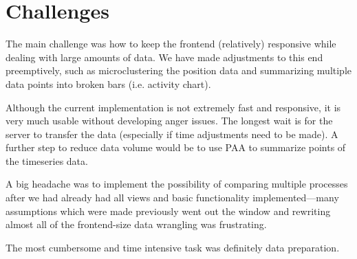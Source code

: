 \documentclass[naustrian]{scrartcl}
\begin{document}
\section{Challenges}

The main challenge was how to keep the frontend (relatively) responsive while
dealing with large amounts of data. We have made adjustments to this end
preemptively, such as microclustering the position data and summarizing
multiple data points into broken bars (i.e. activity chart).

Although the current implementation is not extremely fast and responsive, it is
very much usable without developing anger issues. The longest wait is for the
server to transfer the data (especially if time adjustments need to be made). A
further step to reduce data volume would be to use PAA to summarize points of
the timeseries data.

A big headache was to implement the possibility of comparing multiple processes after we
had already had all views and basic functionality implemented---many assumptions which
were made previously went out the window and rewriting almost all of the frontend-size
data wrangling was frustrating.

The most cumbersome and time intensive task was definitely data preparation.
\end{document}
